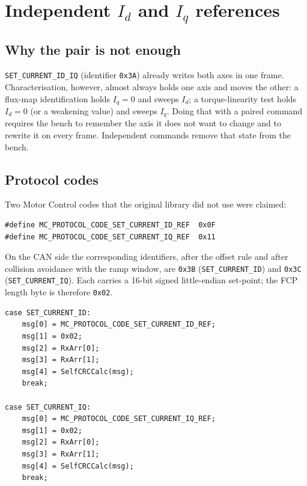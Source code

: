 \section{Independent $I_d$ and $I_q$ references}
\label{sec:id-iq}

\subsection{Why the pair is not enough}
\texttt{SET\_CURRENT\_ID\_IQ} (identifier \texttt{0x3A}) already writes both
axes in one frame. Characterisation, however, almost always holds one axis
and moves the other: a flux-map identification holds $I_q = 0$ and sweeps
$I_d$; a torque-linearity test holds $I_d = 0$ (or a weakening value) and
sweeps $I_q$. Doing that with a paired command requires the bench to
remember the axis it does not want to change and to rewrite it on every
frame. Independent commands remove that state from the bench.

\subsection{Protocol codes}
Two Motor Control codes that the original library did not use were claimed:

\begin{lstlisting}[style=cstyle,caption={New protocol codes for independent current references.}]
#define MC_PROTOCOL_CODE_SET_CURRENT_ID_REF  0x0F
#define MC_PROTOCOL_CODE_SET_CURRENT_IQ_REF  0x11
\end{lstlisting}

On the CAN side the corresponding identifiers, after the offset rule and
after collision avoidance with the ramp window, are \texttt{0x3B}
(\texttt{SET\_CURRENT\_ID}) and \texttt{0x3C} (\texttt{SET\_CURRENT\_IQ}).
Each carries a 16-bit signed little-endian set-point; the FCP length byte
is therefore \texttt{0x02}.

\begin{lstlisting}[style=cstyle,caption={DYNO2DW cases for independent $I_d$ / $I_q$.},label=lst:id-iq-dyno]
case SET_CURRENT_ID:
    msg[0] = MC_PROTOCOL_CODE_SET_CURRENT_ID_REF;
    msg[1] = 0x02;
    msg[2] = RxArr[0];
    msg[3] = RxArr[1];
    msg[4] = SelfCRCCalc(msg);
    break;

case SET_CURRENT_IQ:
    msg[0] = MC_PROTOCOL_CODE_SET_CURRENT_IQ_REF;
    msg[1] = 0x02;
    msg[2] = RxArr[0];
    msg[3] = RxArr[1];
    msg[4] = SelfCRCCalc(msg);
    break;
\end{lstlisting}

